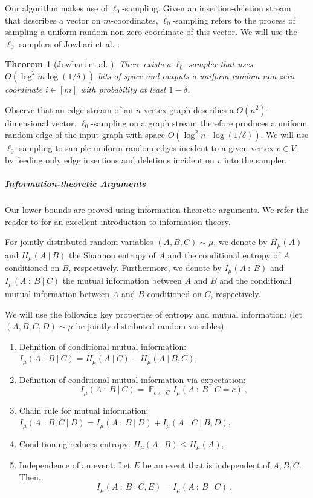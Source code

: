 \documentclass[11pt,a4paper]{article}
\newtheorem{theorem}{Theorem}
\DeclareMathOperator{\Exp}{\mathbb{E}}
\begin{document}
Our algorithm makes use of $\ell_0$-sampling. Given an insertion-deletion stream that describes a vector on $m$-coordinates, $\ell_0$-sampling refers to the process of sampling a uniform random non-zero coordinate of this vector. We will use the $\ell_0$-samplers of Jowhari et al. \cite{jst11}:
\begin{theorem}[Jowhari et al. \cite{jst11}]
    There exists a $\ell_0$-sampler that uses $O(\log^2 m \log(1/\delta))$ bits of space and outputs a uniform random non-zero coordinate $i \in [m]$ with probability at least $1 - \delta$.
\end{theorem}
Observe that an edge stream of an $n$-vertex graph  describes a $\Theta(n^2)$-dimensional vector. $\ell_0$-sampling on a graph stream therefore produces a uniform random edge of the input graph with space $O(\log^2 n \cdot \log(1/\delta))$. We will use $\ell_0$-sampling to sample uniform random edges incident to a given vertex $v \in V$, by feeding only edge insertions and deletions incident on $v$ into the sampler.

\subparagraph{Information-theoretic Arguments} %
Our lower bounds are proved using information-theoretic arguments. We refer the reader to \cite{ct06} for an excellent introduction to information theory.

For jointly distributed random variables $(A,B,C) \sim \mu$, we denote by $H_{\mu}(A)$ and $H_{\mu}(A \ | \ B)$ the Shannon entropy of $A$ and the conditional entropy of $A$ conditioned on $B$, respectively. Furthermore, we denote by $I_{\mu}(A \ : \ B)$ and $I_{\mu}(A \ : \ B \ | \ C)$ the mutual information between $A$ and $B$ and the conditional mutual information between $A$ and $B$ conditioned on $C$, respectively. 

We will use the following key properties of entropy and mutual information: (let $(A,B,C,D) \sim \mu$ be jointly distributed random variables)

\begin{enumerate} 
 \item Definition of conditional mutual information: $I_{\mu}(A \ : \ B \ | \ C) = H_{\mu}(A \ | \ C) - H_{\mu}(A \ | \ B,C)$,

 \item Definition of conditional mutual information via expectation: $$\displaystyle I_{\mu}(A \ : \ B \ | \ C) = \Exp_{c \gets C} I_{\mu}(A \ : \ B \ | \ C = c) \ ,$$

 \item Chain rule for mutual information: $I_{\mu}(A \ : \ B,C \ | \ D) = I_{\mu}(A \ : \ B \ | \ D) + I_{\mu}(A \ : \ C \ | \ B,D)$,


 \item Conditioning reduces entropy: $H_{\mu}(A \ | \ B) \le H_{\mu}(A)$,

 \item Independence of an event: Let $E$ be an event that is independent of $A,B,C$. Then,  $$I_{\mu}(A \ : \ B \ | \ C, E) = I_{\mu}(A \ : \ B \ | \ C) \ . $$
\end{enumerate}
\end{document}
